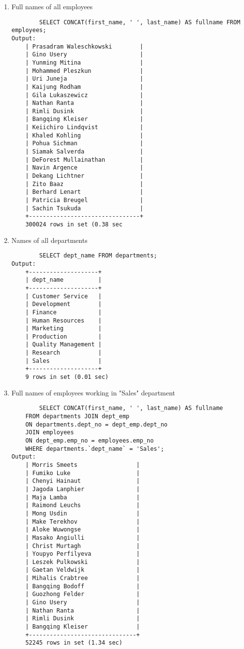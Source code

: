 \documentclass[12pt, letterpaper, twoside]{article}
\begin{document}
\begin{enumerate}
		\item Full names of all employees \\
		\begin{verbatim}
		SELECT CONCAT(first_name, ' ', last_name) AS fullname FROM employees;
Output:
	| Prasadram Waleschkowski        |
	| Gino Usery                     |
	| Yunming Mitina                 |
	| Mohammed Pleszkun              |
	| Uri Juneja                     |
	| Kaijung Rodham                 |
	| Gila Lukaszewicz               |
	| Nathan Ranta                   |
	| Rimli Dusink                   |
	| Bangqing Kleiser               |
	| Keiichiro Lindqvist            |
	| Khaled Kohling                 |
	| Pohua Sichman                  |
	| Siamak Salverda                |
	| DeForest Mullainathan          |
	| Navin Argence                  |
	| Dekang Lichtner                |
	| Zito Baaz                      |
	| Berhard Lenart                 |
	| Patricia Breugel               |
	| Sachin Tsukuda                 |
	+--------------------------------+
	300024 rows in set (0.38 sec

		\end{verbatim}
		
		\item Names of all departments \\
		\begin{verbatim}
		SELECT dept_name FROM departments;
Output:
	+--------------------+
	| dept_name          |
	+--------------------+
	| Customer Service   |
	| Development        |
	| Finance            |
	| Human Resources    |
	| Marketing          |
	| Production         |
	| Quality Management |
	| Research           |
	| Sales              |
	+--------------------+
	9 rows in set (0.01 sec)
		\end{verbatim}	
		
		\item Full names of employees working in "Sales" department\\
		\begin{verbatim}
		SELECT CONCAT(first_name, ' ', last_name) AS fullname
	FROM departments JOIN dept_emp 
	ON departments.dept_no = dept_emp.dept_no
	JOIN employees
	ON dept_emp.emp_no = employees.emp_no
	WHERE departments.`dept_name` = 'Sales';
Output:
	| Morris Smeets                 |
	| Fumiko Luke                   |
	| Chenyi Hainaut                |
	| Jagoda Lanphier               |
	| Maja Lamba                    |
	| Raimond Leuchs                |
	| Mong Usdin                    |
	| Make Terekhov                 |
	| Aloke Wuwongse                |
	| Masako Angiulli               |
	| Christ Murtagh                |
	| Youpyo Perfilyeva             |
	| Leszek Pulkowski              |
	| Gaetan Veldwijk               |
	| Mihalis Crabtree              |
	| Bangqing Bodoff               |
	| Guozhong Felder               |
	| Gino Usery                    |
	| Nathan Ranta                  |
	| Rimli Dusink                  |
	| Bangqing Kleiser              |
	+-------------------------------+
	52245 rows in set (1.34 sec)
		\end{verbatim}
		

\end{enumerate}
\end{document}
